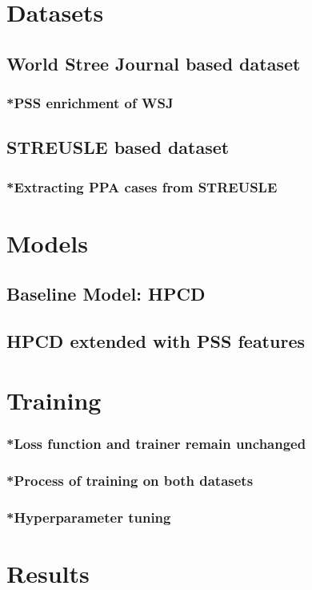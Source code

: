 \section{Datasets}
\subsection{World Stree Journal based dataset}
\subsubsection{*PSS enrichment of WSJ}
\subsection{STREUSLE based dataset}
\subsubsection{*Extracting PPA cases from STREUSLE}

\section{Models}
\subsection{Baseline Model: HPCD}
\subsection{HPCD extended with PSS features}

\section{Training}
\subsubsection{*Loss function and trainer remain unchanged}
\subsubsection{*Process of training on both datasets}
\subsubsection{*Hyperparameter tuning}

\section{Results}
